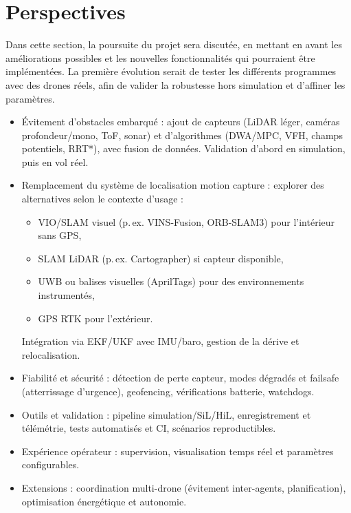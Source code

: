 \section{Perspectives}

Dans cette section, la poursuite du projet sera discutée, en mettant en avant les améliorations possibles et les nouvelles fonctionnalités qui pourraient être implémentées. La première évolution serait de tester les différents programmes avec des drones réels, afin de valider la robustesse hors simulation et d’affiner les paramètres.

\begin{itemize}
    \item Évitement d’obstacles embarqué : ajout de capteurs (LiDAR léger, caméras profondeur/mono, ToF, sonar) et d’algorithmes (DWA/MPC, VFH, champs potentiels, RRT*), avec fusion de données. Validation d’abord en simulation, puis en vol réel.
    \item Remplacement du système de localisation motion capture : explorer des alternatives selon le contexte d’usage :
        \begin{itemize}
            \item VIO/SLAM visuel (p.\,ex. VINS-Fusion, ORB-SLAM3) pour l’intérieur sans GPS,
            \item SLAM LiDAR (p.\,ex. Cartographer) si capteur disponible,
            \item UWB ou balises visuelles (AprilTags) pour des environnements instrumentés,
            \item GPS RTK pour l’extérieur.
        \end{itemize}
        Intégration via EKF/UKF avec IMU/baro, gestion de la dérive et relocalisation.
    \item Fiabilité et sécurité : détection de perte capteur, modes dégradés et failsafe (atterrissage d’urgence), geofencing, vérifications batterie, watchdogs.
    \item Outils et validation : pipeline simulation/SiL/HiL, enregistrement et télémétrie, tests automatisés et CI, scénarios reproductibles.
    \item Expérience opérateur : supervision, visualisation temps réel et paramètres configurables.
    \item Extensions : coordination multi-drone (évitement inter-agents, planification), optimisation énergétique et autonomie.
\end{itemize}